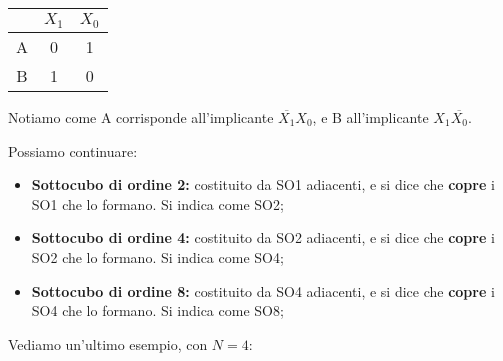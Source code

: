 \documentclass[a4paper,11pt]{article}
\begin{document}
\begin{center}
\noindent
\begin{minipage}{0.15\textwidth}
\begin{karnaugh-map}[2][2][1]
\end{karnaugh-map}
\end{minipage}%
\hspace{3cm}
\begin{minipage}{0.15\textwidth}
	\begin{table}[H]
		\center {}
		\begin{tabular} { c || c | c }
			& $X_1$ & $X_0$ \\ 
			\hline 
			\rowcolor{red!20!white} A & 0 & 1 \\
			\rowcolor{green!20!white} B & 1 & 0 \\
		\end{tabular}
	\end{table}
\end{minipage}
\end{center}

Notiamo come A corrisponde all'implicante $\overline{X_1}X_0$, e B all'implicante $X_1\overline{X_0}$.

Possiamo continuare:
\begin{itemize}
	\item \textbf{Sottocubo di ordine 2:} costituito da SO1 adiacenti, e si dice che \textbf{copre} i SO1 che lo formano. Si indica come SO2;
	\item \textbf{Sottocubo di ordine 4:} costituito da SO2 adiacenti, e si dice che \textbf{copre} i SO2 che lo formano. Si indica come SO4;
	\item \textbf{Sottocubo di ordine 8:} costituito da SO4 adiacenti, e si dice che \textbf{copre} i SO4 che lo formano. Si indica come SO8;
\end{itemize}

Vediamo un'ultimo esempio, con $N=4$: 
\end{document}
